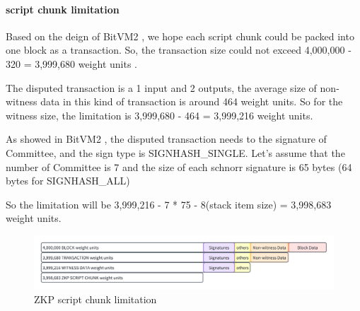 \paragraph*{script chunk limitation}

Based on the deign of BitVM2 \cite{website:BitVM2}, we hope each script chunk could be packed into one block as a transaction.
So, the transaction size could not exceed 4,000,000 - 320 = 3,999,680 weight units \cite{website:transaction-size}.

The disputed transaction is a 1 input and 2 outputs, the average size of non-witness data in this kind of transaction is around 464 weight units.
So for the witness size, the limitation is 3,999,680 - 464 = 3,999,216 weight units.

As showed in BitVM2 \cite{website:BitVM2}, the disputed transaction needs to the signature of Committee, and the sign type is
SIGNHASH\_SINGLE. Let's assume that the number of Committee is 7 and the size of each schnorr signature is 65 bytes (64 bytes for SIGNHASH\_ALL)

So the limitation will be 3,999,216 - 7 * 75 - 8(stack item size) = 3,998,683 weight units.

\begin{figure}[ht] 
    \centering  
    \includegraphics[width=0.85\columnwidth]{images/ZKP-script-chunk-limitation.png} 
    \caption{ZKP script chunk limitation}
    \label{fig:ZKP-script-chunk-limitation}
\end{figure}
